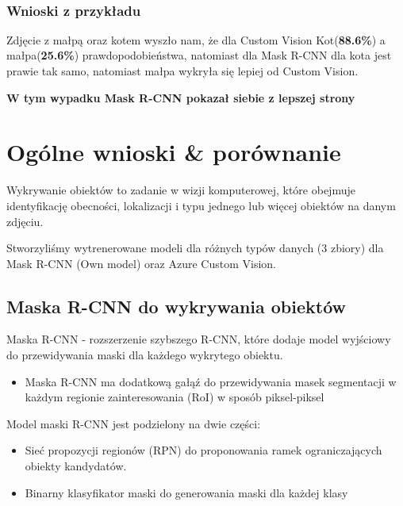 \documentclass[11pt]{article}
\begin{document}
    \begin{center}
    \end{center}
    { \hspace*{\fill} \\}
    
    \hypertarget{wnioski-z-przykux142adu}{%
\subsubsection{Wnioski z przykładu}\label{wnioski-z-przykux142adu}}

Zdjęcie z małpą oraz kotem wyszło nam, że dla Custom Vision
Kot(\textbf{88.6\%}) a małpa(\textbf{25.6\%}) prawdopodobieństwa,
natomiast dla Mask R-CNN dla kota jest prawie tak samo, natomiast małpa
wykryła się lepiej od Custom Vision.

\textbf{W tym wypadku Mask R-CNN pokazał siebie z lepszej strony}

    \hypertarget{oguxf3lne-wnioski-poruxf3wnanie}{%
\section{Ogólne wnioski \&
porównanie}\label{oguxf3lne-wnioski-poruxf3wnanie}}

    Wykrywanie obiektów to zadanie w wizji komputerowej, które obejmuje
identyfikację obecności, lokalizacji i typu jednego lub więcej obiektów
na danym zdjęciu.

Stworzyliśmy wytrenerowane modeli dla różnych typów danych (3 zbiory)
dla Mask R-CNN (Own model) oraz Azure Custom Vision.

\hypertarget{maska-r-cnn-do-wykrywania-obiektuxf3w}{%
\subsection{Maska R-CNN do wykrywania
obiektów}\label{maska-r-cnn-do-wykrywania-obiektuxf3w}}

Maska R-CNN - rozszerzenie szybszego R-CNN, które dodaje model wyjściowy
do przewidywania maski dla każdego wykrytego obiektu. 
\begin{itemize}
    \item  Maska R-CNN ma dodatkową gałąź do przewidywania masek segmentacji w każdym regionie zainteresowania (RoI) w sposób piksel-piksel
\end{itemize}


Model maski R-CNN jest podzielony na dwie części: 
\begin{itemize}
    \item  Sieć propozycji
regionów (RPN) do proponowania ramek ograniczających obiekty kandydatów.
\item  Binarny klasyfikator maski do generowania maski dla każdej klasy
\end{itemize}
\end{document}
